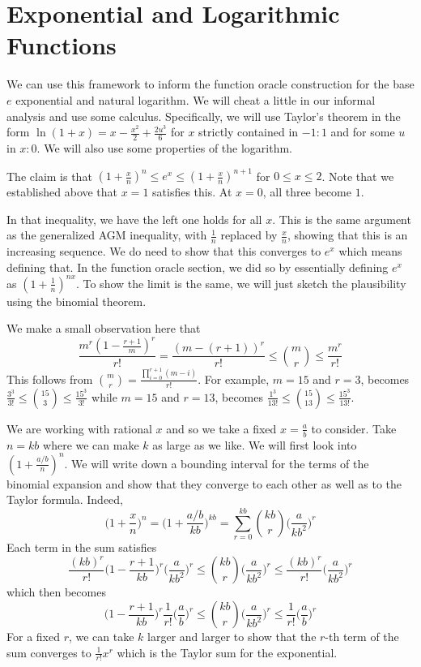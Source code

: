 \documentclass[12pt]{article}
\begin{document}
\medskip

\appendix

\section{Exponential and Logarithmic Functions}\label{app:e}

We can use this framework to inform the function oracle construction for the base $e$ exponential and natural logarithm. We will cheat a little in our informal analysis and use some calculus. Specifically, we will use Taylor's theorem in the form $\ln(1+x) = x - \frac{x^2}{2} + \frac{2u^3}{6}$ for $x$ strictly contained in $-1:1$ and for some $u$ in $x:0$. We will also use some properties of the logarithm. 

The claim is that $(1+\frac{x}{n})^n \leq e^x \leq (1+\frac{x}{n})^{n+1}$ for $0 \leq x \leq 2$. Note that we established above that $x=1$ satisfies this. At $x=0$, all three become $1$. 

In that inequality, we have the left one holds for all $x$. This is the same argument as the generalized AGM inequality, with $\frac{1}{n}$ replaced by $\frac{x}{n}$, showing that this is an increasing sequence. We do need to show that this converges to $e^x$ which means defining that. In the function oracle section, we did so by essentially defining $e^x$ as $(1+\frac{1}{n})^{nx}$. To show the limit is the same, we will just sketch the plausibility using the binomial theorem. 

We make a small observation here that $$\frac{m^r(1 - \frac{r+1}{m})^r}{r!} = \frac{(m - (r+1))^r}{r!} \leq \binom{m}{r} \leq \frac{m^r}{r!}$$ This follows from $\binom{m}{r} = \frac{\prod_{i=0}^{r+1} (m-i)}{r!}$. For example, $m=15$ and $r=3$, becomes $\frac{3^3}{3!} \leq \binom{15}{3} \leq \frac{15^3}{3!}$ while $m=15$ and $r=13$, becomes $\frac{1^3}{13!} \leq \binom{15}{13} \leq \frac{15^3}{13!}$. 

We are working with rational $x$ and so we take a fixed $x=\frac{a}{b}$ to consider. Take $n = kb$ where we can make $k$ as large as we like. We will first look into $(1+ \frac{a/b}{n})^n$. We will write down a bounding interval for the terms of the binomial expansion and show that they converge to each other as well as to the Taylor formula. Indeed, 
$$\bigg(1+\frac{x}{n}\bigg)^n = \bigg(1+ \frac{a/b}{kb}\bigg)^{kb} = \sum_{r=0}^{kb} \binom{kb}{r} \bigg(\frac{a}{kb^2}\bigg)^r$$
Each term in the sum satisfies 
$$\frac{(kb)^r}{r!} \bigg( 1 - \frac{r+1}{kb}\bigg)^r \bigg(\frac{a}{kb^2}\bigg)^r \leq \binom{kb}{r} \bigg(\frac{a}{kb^2}\bigg)^r \leq \frac{(kb)^r}{r!} \bigg(\frac{a}{kb^2}\bigg)^r$$ 
which then becomes
$$\bigg( 1 - \frac{r+1}{kb}\bigg)^r \frac{1}{r!} \bigg(\frac{a}{b}\bigg)^r \leq \binom{kb}{r} \bigg(\frac{a}{kb^2}\bigg)^r \leq \frac{1}{r!}\bigg(\frac{a}{b}\bigg)^r$$ 
For a fixed $r$, we can take $k$ larger and larger to show that the $r$-th term of the sum converges to $\frac{1}{r!}x^r$ which is the Taylor sum for the exponential. 
\end{document}
